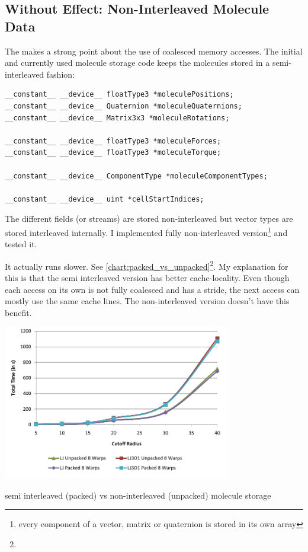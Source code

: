 \subsection{Without Effect: Non-Interleaved Molecule Data}
The  makes a strong point about the use of coalesced memory accesses. The initial and currently used molecule storage code keeps the molecules stored in a semi-interleaved fashion:
\begin{lstlisting}[caption=Molecule Storage Declarations]
__constant__ __device__ floatType3 *moleculePositions;
__constant__ __device__ Quaternion *moleculeQuaternions;
__constant__ __device__ Matrix3x3 *moleculeRotations;

__constant__ __device__ floatType3 *moleculeForces;
__constant__ __device__ floatType3 *moleculeTorque;

__constant__ __device__ ComponentType *moleculeComponentTypes;

__constant__ __device__ uint *cellStartIndices;
\end{lstlisting}
The different fields (or streams) are stored non-interleaved but vector types are stored interleaved internally. I implemented fully non-interleaved version\footnote{every component of a vector, matrix or quaternion is stored in its own array} and tested it.

It actually runs slower. See \autoref{chart:packed_vs_unpacked}\footnote{\cudaConfigDouble{}}. My explanation for this is that the semi interleaved version has better cache-locality. Even though each access on its own is not fully coalesced and has a stride, the next access can mostly use the same cache lines.
The non-interleaved version doesn't have this benefit.
\begin{chart}
\centering
\includegraphics[width=0.75\textwidth]{plots/packed_vs_unpacked.pdf}
\caption{semi interleaved (packed) vs non-interleaved (unpacked) molecule storage}
\label{chart:packed_vs_unpacked}
\end{chart}